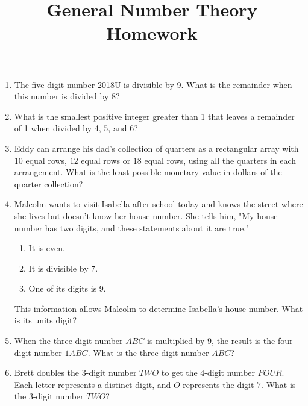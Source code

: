 \documentclass{article}
\title{General Number Theory Homework}
\date{}
\author{}
\begin{document}
\maketitle

\begin{enumerate}
    \item The five-digit number 2018U is divisible by 9. What is the remainder when this number is divided by 8?
        \vspace{3cm}
    \item What is the smallest positive integer greater than 1 that leaves a remainder of 1 when divided by 4, 5, and 6?
        \vspace{3cm}
    \item Eddy can arrange his dad's collection of quarters as a rectangular array with $10$ equal rows, $12$ equal rows or $18$ equal rows, using all the quarters in each arrangement.
        What is the least possible monetary value in dollars of the quarter collection?
        \vspace{3cm}
    \item Malcolm wants to visit Isabella after school today and knows the street where she lives but doesn't know her house number. 
        She tells him, "My house number has two digits, and these statements about it are true."
        \begin{enumerate}
            \item It is even.
            \item It is divisible by 7.
            \item One of its digits is 9.
        \end{enumerate}
        This information allows Malcolm to determine Isabella's house number. 
        What is its units digit?
        \vspace{3cm}
    \item When the three-digit number $ABC$ is multiplied by $9$, the result is the four-digit number $1ABC$.
        What is the three-digit number $ABC$?
        \vspace{3cm}
    \item Brett doubles the $3$-digit number $TWO$ to get the $4$-digit number $FOUR$.
        Each letter represents a distinct digit, and $O$ represents the digit $7$.
        What is the $3$-digit number $TWO$?
        \vspace{3cm}
\end{enumerate}
\end{document}
